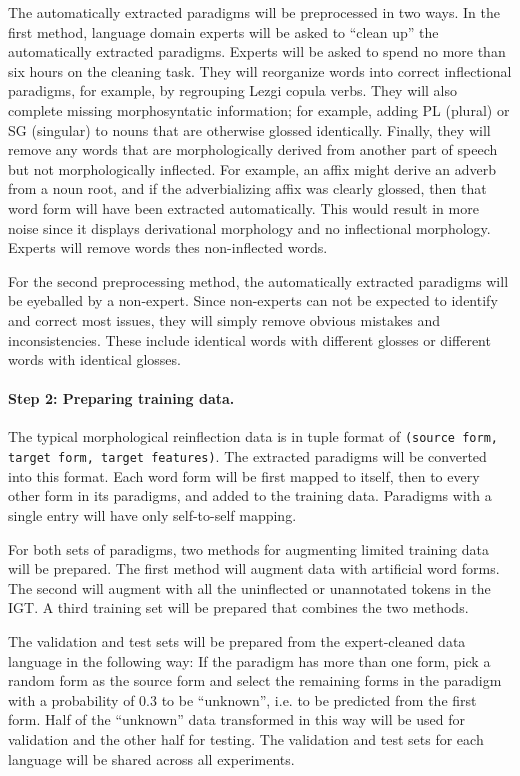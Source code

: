 The automatically extracted paradigms will be preprocessed in two ways. In the first method, language domain experts will be asked to ``clean up'' the automatically extracted paradigms. Experts will be asked to spend no more than six hours on the cleaning task. They will reorganize words into correct inflectional paradigms, for example, by regrouping Lezgi copula verbs. They will also complete missing morphosyntatic information; for example, adding PL (plural) or SG (singular) to nouns that are otherwise glossed identically. Finally, they will remove any words that are morphologically derived from another part of speech but not morphologically inflected. For example, an affix might derive an adverb from a noun root, and if the adverbializing affix was clearly glossed, then that word form will have been extracted automatically. This would result in more noise since it displays derivational morphology and no inflectional morphology. Experts will remove words thes non-inflected words.

For the second preprocessing method, the automatically extracted paradigms will be eyeballed by a non-expert. Since non-experts can not be expected to identify and correct most issues, they will simply remove obvious mistakes and inconsistencies. These include identical words with different glosses or different words with identical glosses.


\paragraph{Step 2: Preparing training data.}
The typical morphological reinflection data is in tuple format of \texttt{(source form, target form, target features)}. The extracted paradigms will be converted into this format. Each word form will be first mapped to itself, then to every other form in its paradigms, and added to the training data. Paradigms with a single entry will have only self-to-self mapping. 

For both sets of paradigms, two methods for augmenting limited training data will be prepared. The first method will augment data with artificial word forms. The second will augment with all the uninflected or unannotated tokens in the IGT. A third training set will be prepared that combines the two methods.

The validation and test sets will be prepared from the expert-cleaned data language in the following way: If the paradigm has more than one form, pick a random form as the source form and select the remaining forms in the paradigm with a probability of 0.3 to be ``unknown'', i.e. to be predicted from the first form. Half of the ``unknown'' data transformed in this way will be used for validation and the other half for testing. The validation and test sets for each language will be shared across all experiments.
 
